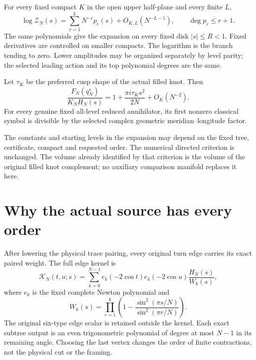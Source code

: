 \begin{theorem}
For every fixed compact $K$ in the open upper half-plane and every
finite $L$,
\begin{equation}\label{dao-ch:expansion}
 \log\mathcal Z_N(s)
  =\sum_{r=1}^{L}N^{-r}p_r(s)+O_{K,L}(N^{-L-1}),
       \qquad \deg p_r\le r+1.
\end{equation}
The same polynomials give the expansion on every fixed disk
$|s|\le R<1$. Fixed derivatives are controlled on smaller compacts.
The logarithm is the branch tending to zero. Lower amplitudes may be
organized separately by level parity; the selected leading action
and its top polynomial degrees are the same.

Let $\tau_K$ be the preferred cusp shape of the actual filled knot.
Then
\begin{equation}\label{dao-ch:cusp}
 \frac{F_N(q_N^s)}{K_NH_N(s)}
     =1+\frac{\pi i\tau_Ks^2}{2N}+O_K(N^{-2}).
\end{equation}
For every genuine fixed all-level reduced annihilator, its first
nonzero classical symbol is divisible by the selected complex
geometric meridian--longitude factor.
\end{theorem}

The constants and starting levels in the expansion may depend on
the fixed tree, certificate, compact and requested order. The
numerical directed criterion is unchanged. The volume already
identified by that criterion is the volume of the original filled
knot complement; no auxiliary comparison manifold replaces it here.

\section{Why the actual source has every order}
\label{dao-ch:source}

After lowering the physical trace pairing, every original turn edge
carries its exact paired weight. The full edge kernel is
\begin{equation}\label{dao-ch:kernel}
 \mathscr K_N(t,u;s)=\sum_{k=0}^{N-1}
 e_k(-2\cos t)e_k(-2\cos u)\frac{H_N(s)}{W_k(s)},
\end{equation}
where $e_k$ is the fixed complete Newton polynomial and
\[
 W_k(s)=\prod_{r=1}^{k}
       \left(1-\frac{\sin^2(\pi s/N)}{\sin^2(\pi r/N)}\right).
\]
The original six-type edge scalar is retained outside the kernel.
Each exact subtree output is an even trigonometric polynomial of
degree at most $N-1$ in its remaining angle. Choosing the last
vertex changes the order of finite contractions, not the physical
cut or the framing.

